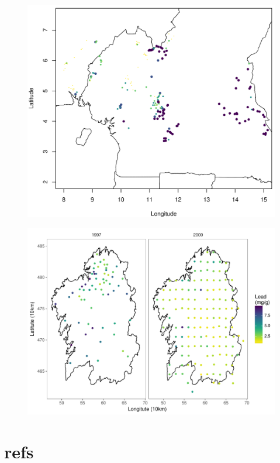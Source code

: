 \documentclass{beamer}
\begin{document}
\begin{tframe}
\begin{figure}
\centering
\includegraphics[width=.8\textwidth]{demo011}
\end{figure}
\end{tframe}

\begin{tframe}
\begin{figure}
\centering
\includegraphics[width=.8\textwidth]{demo03}
\end{figure}
\end{tframe}



\section{refs}
\end{document}

